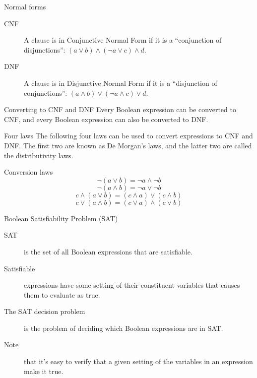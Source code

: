 \begin{frame}{Normal forms}
  \begin{description}
    \item[CNF] A clause is in Conjunctive Normal Form if it is a ``conjunction of disjunctions'': $(a \lor b) \land (\neg a \lor c) \land d$.
    \vspace{0.5cm}
    \item[DNF] A clause is in Disjunctive Normal Form if it is a ``disjunction of conjunctions'': $(a \land b) \lor (\neg a \land c) \lor d$.
  \end{description}
  
  \vspace{4mm}
  \begin{alertblock}{Converting to CNF and DNF}
    Every Boolean expression can be converted to CNF, and every Boolean expression can also be converted to DNF.
  \end{alertblock}
\end{frame}


\begin{frame}{Four laws}
  The following four laws can be used to convert expressions to CNF and DNF.
  The first two are known as De Morgan's laws, and the latter two are called the distributivity laws.
  \vspace{4mm}
  \begin{alertblock}{Conversion laws}
    \[ \neg ( a \lor b) = \neg a \land \neg b \]
    \[ \neg ( a \land b) = \neg a \lor \neg b \]
    \[ c \land ( a \lor b) = (c \land a) \lor (c \land b) \]
    \[ c \lor ( a \land b) = (c \lor a) \land (c \lor b) \]
  \end{alertblock}
\end{frame}


\begin{frame}{Boolean Satisfiability Problem (SAT)}
  \begin{description}
    \item[SAT] is the set of all Boolean expressions that are satisfiable.
    \item[Satisfiable] expressions have some setting of their constituent variables that causes them to evaluate as true.
    \item[The SAT decision problem] is the problem of deciding which Boolean expressions are in SAT.
    \item[Note] that it's easy to verify that a given setting of the variables in an expression make it true.
  \end{description}
\end{frame}


